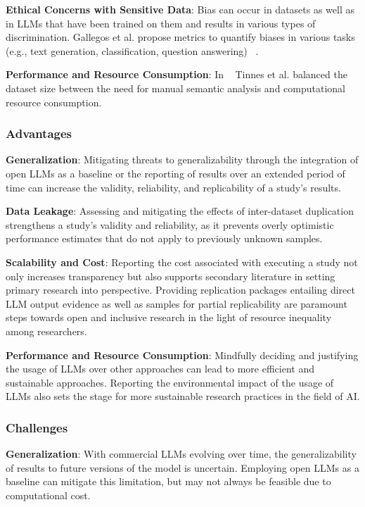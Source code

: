 \textbf{Ethical Concerns with Sensitive Data}:
Bias can occur in datasets as well as in LLMs that have been trained on them and results in various types of discrimination. Gallegos et al. propose metrics to quantify biases in various tasks (e.g., text generation, classification, question answering) ~\cite{DBLP:journals/corr/abs-2309-00770}.

\textbf{Performance and Resource Consumption}:
In ~\cite{tinnessoftware} Tinnes et al. balanced the dataset size between the need for manual semantic analysis and computational resource consumption.

\subsubsection{Advantages}
\textbf{Generalization}:
Mitigating threats to generalizability through the integration of open LLMs as a baseline or the reporting of results over an extended period of time can increase the validity, reliability, and replicability of a study's results.

\textbf{Data Leakage}:
Assessing and mitigating the effects of inter-dataset duplication strengthens a study's validity and reliability, as it prevents overly optimistic performance estimates that do not apply to previously unknown samples.

\textbf{Scalability and Cost}:
Reporting the cost associated with executing a study not only increases transparency but also supports secondary literature in setting primary research into perspective.
Providing replication packages entailing direct LLM output evidence as well as samples for partial replicability are paramount steps towards open and inclusive research in the light of resource inequality among researchers.

\textbf{Performance and Resource Consumption}:
Mindfully deciding and justifying the usage of LLMs over other approaches can lead to more efficient and sustainable approaches. 
Reporting the environmental impact of the usage of LLMs also sets the stage for more sustainable research practices in the field of AI.

\subsubsection{Challenges}
\textbf{Generalization}:
With commercial LLMs evolving over time, the generalizability of results to future versions of the model is uncertain. Employing open LLMs as a baseline can mitigate this limitation, but may not always be feasible due to computational cost.

